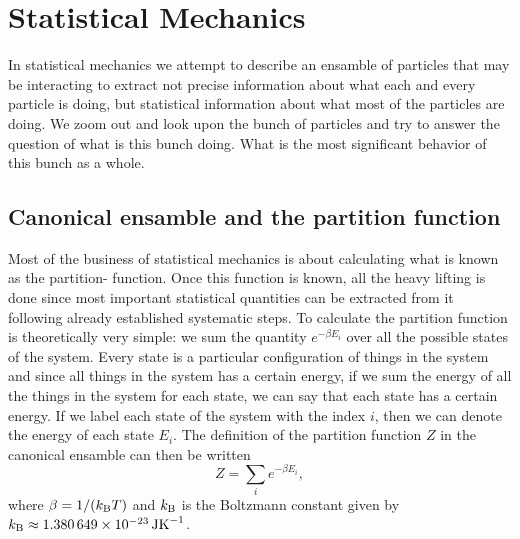 \chapter{Statistical Mechanics}
\label{chap:statMech}

In statistical mechanics we attempt to describe an ensamble of particles that may be interacting
to extract not precise information about what each and every particle is doing, but statistical
information about what most of the particles are doing. We zoom out and look upon the bunch of
particles and try to answer the question of what is this bunch doing. What is the most significant
behavior of this bunch as a whole.

\section{Canonical ensamble and the partition function}

Most of the business of statistical mechanics is about calculating what is known as the partition-
function. Once this function is known, all the heavy lifting is done since most important statistical
quantities can be extracted from it following already established systematic steps.
To calculate the partition function is theoretically very simple: we sum the quantity $e^{-\beta E_i}$
over all the possible states of the system. Every state is a particular configuration of things in
the system and since all things in the system has a certain energy, if we sum the energy of all the
things in the system for each state, we can say that each state has a certain energy. If we label
each state of the system with the index $i$, then we can denote the energy of each state $E_i$. The
definition of the partition function $Z$ in the canonical ensamble can then be written
\begin{equation}
    Z = \sum_i e^{-\beta E_i},
    \label{eq:statMech:partDef}
\end{equation}
where $\beta = 1/(\boltz T)$ and $\boltz$ is the Boltzmann constant given by 
$\boltz \approx \SI{1.380649d-23}{JK^{-1}}$.

